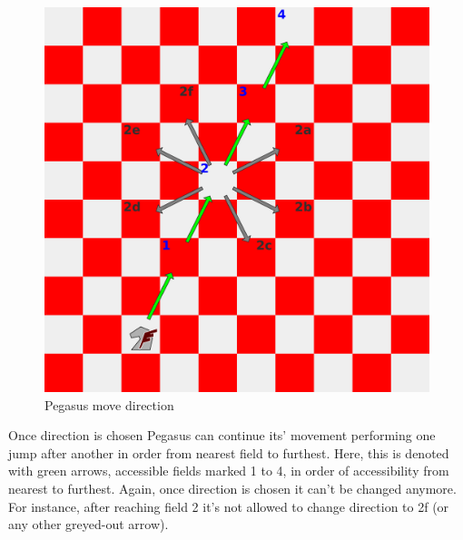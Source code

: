 \documentclass[a5paper,12pt,draft]{book} %
\begin{document}
\noindent
\begin{figure}[!t]
\includegraphics[width=1.0\textwidth, keepaspectratio=true]{../gfx/examples/02_move_pegasus_direction.png}
\caption{Pegasus move direction}
\label{fig:pegasus_move_direction}
\end{figure}
\indent
Once direction is chosen Pegasus can continue its' movement performing one jump
after another in order from nearest field to furthest. Here, this is denoted
with green arrows, accessible fields marked 1 to 4, in order of accessibility
from nearest to furthest. Again, once direction is chosen it can't be changed
anymore. For instance, after reaching field 2 it's not allowed to change
direction to 2f (or any other greyed-out arrow).

\clearpage
\end{document}
